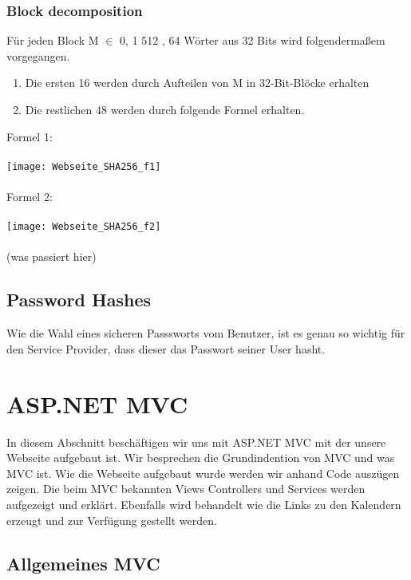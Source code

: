 {\subsubsection{Block decomposition}
Für jeden Block M $\in$ {0, 1} 512 , 64 Wörter aus 32 Bits wird folgendermaßem vorgegangen. 

\begin{enumerate}
\item Die ersten 16 werden durch Aufteilen von M in 32-Bit-Blöcke erhalten
\item Die restlichen 48 werden durch folgende Formel erhalten.
\end{enumerate}
Formel 1:
\\ \\
\texttt{[image: Webseite\_SHA256\_f1]}
\\ \\Formel 2:\\ \\
\texttt{[image: Webseite\_SHA256\_f2]}
\\ \\
(was passiert hier)
\subsection{Password Hashes}
\label{sec:hash}
Wie die Wahl eines sicheren Passsworts vom Benutzer, ist es genau so wichtig für den Service Provider, dass dieser das Passwort seiner User hasht.

\section{ASP.NET MVC}
\label{sec:MVC}
In diesem Abschnitt beschäftigen wir uns mit ASP.NET MVC mit der unsere Webseite aufgebaut ist. Wir besprechen die Grundindention von MVC und was MVC ist. Wie die Webseite aufgebaut wurde werden wir anhand Code auszügen zeigen. Die beim MVC bekannten Views Controllers und Services werden aufgezeigt und erklärt. Ebenfalls wird behandelt wie die Links zu den Kalendern erzeugt und zur Verfügung gestellt werden. 

\subsection{Allgemeines MVC}
\label{sec:allgemein}
}
